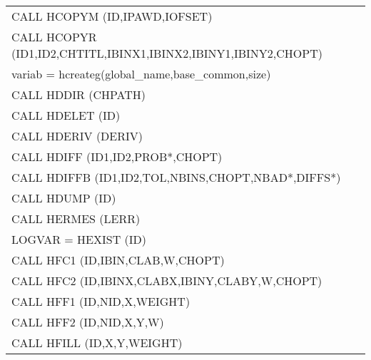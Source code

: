 \begin{longtable}{|>{\ttfamily\small}p{.9\linewidth}r|}
CALL     HCOPYM (ID,IPAWD,IOFSET)            
&                                                       \pageref{HCOPYM} \\
CALL     HCOPYR (ID1,ID2,CHTITL,IBINX1,IBINX2,IBINY1,IBINY2,CHOPT)
&                                                       \pageref{HCOPYR} \\
variab = hcreateg(global\_name,base\_common,size)
&                                                     \pageref{hcreateg} \\
CALL     HDDIR  (CHPATH)                         
&                                                       \pageref{HDDIR}  \\
CALL     HDELET (ID)                         
&                                                       \pageref{HDELET} \\
CALL     HDERIV (DERIV)                      
&                                                       \pageref{HDERIV} \\
CALL     HDIFF  (ID1,ID2,PROB*,CHOPT)        
&                                                       \pageref{HDIFF}  \\
CALL     HDIFFB (ID1,ID2,TOL,NBINS,CHOPT,NBAD*,DIFFS*)
&                                                       \pageref{HDIFFB} \\
CALL     HDUMP  (ID)                         
&                                                       \pageref{HDUMP}  \\
CALL     HERMES (LERR)                       
&                                                       \pageref{HERMES} \\
LOGVAR = HEXIST (ID)                         
&                                                       \pageref{HEXIST} \\
CALL     HFC1   (ID,IBIN,CLAB,W,CHOPT)
&                                                       \pageref{HFC1}   \\
CALL     HFC2   (ID,IBINX,CLABX,IBINY,CLABY,W,CHOPT)
&                                                       \pageref{HFC2}   \\
CALL     HFF1   (ID,NID,X,WEIGHT)            
&                                                       \pageref{HFF1}   \\
CALL     HFF2   (ID,NID,X,Y,W)               
&                                                       \pageref{HFF2}   \\
CALL     HFILL  (ID,X,Y,WEIGHT)              
&                                                       \pageref{HFILL}  \\

\end{longtable}
